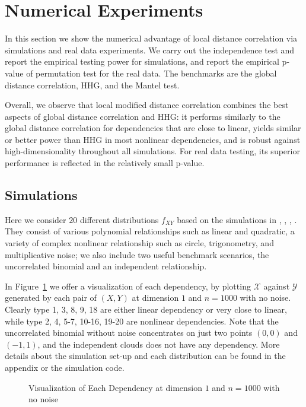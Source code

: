 \documentclass[12pt]{article}
\begin{document}
\section{Numerical Experiments}
\label{numer}
In this section we show the numerical advantage of local distance correlation via simulations and real data experiments. We carry out the independence test and report the empirical testing power for simulations, and report the empirical p-value of permutation test for the real data. The benchmarks are the global distance correlation, HHG, and the Mantel test. 

Overall, we observe that local modified distance correlation combines the best aspects of global distance correlation and HHG: it performs similarly to the global distance correlation for dependencies that are close to linear, yields similar or better power than HHG in most nonlinear dependencies, and is robust against high-dimensionality throughout all simulations. For real data testing, its superior performance is reflected in the relatively small p-value.

\subsection{Simulations}
\label{numer1}
Here we consider $20$ different distributions $f_{XY}$ based on the simulations in \cite{SzekelyRizzoBakirov2007}, \cite{SimonTibshirani2012}, \cite{GorfineHellerHeller2012}, \cite{HellerGorfine2013}. They consist of various polynomial relationships such as linear and quadratic, a variety of complex nonlinear relationship such as circle, trigonometry, and multiplicative noise; we also include two useful benchmark scenarios, the uncorrelated binomial and an independent relationship. 

In Figure~\ref{fig0} we offer a visualization of each dependency, by plotting $\mathcal{X}$ against $\mathcal{Y}$ generated by each pair of $(X,Y)$ at dimension $1$ and $n=1000$ with no noise. Clearly type 1, 3, 8, 9, 18 are either linear dependency or very close to linear, while type 2, 4, 5-7, 10-16, 19-20 are nonlinear dependencies. Note that the uncorrelated binomial without noise concentrates on just two points $(0,0)$ and $(-1,1)$, and the independent clouds does not have any dependency. More details about the simulation set-up and each distribution can be found in the appendix or the simulation code.

\begin{figure}[htbp]
\caption{Visualization of Each Dependency at dimension $1$ and $n=1000$ with no noise}
\label{fig0}
\end{figure}
\end{document}
